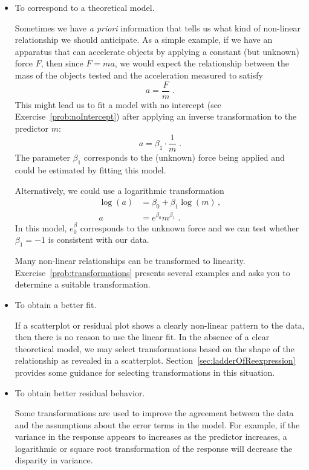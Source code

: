 \documentclass[twoside]{book}\usepackage[]{graphicx}\usepackage[]{xcolor}
\newcounter{example}[section]
\begin{document}
\begin{itemize}
  \item To correspond to a theoretical model.

	Sometimes we have \emph{a priori} information that tells us what 
	kind of non-linear relationship we should anticipate.  As a simple example,
	if we have an apparatus that can accelerate objects by applying a constant
	(but unknown) force $F$, 
	then since $F = ma$, we would expect the relationship between 
	the mass of the objects tested and the acceleration measured to satisfy
	\[
	a = \frac{F}{m}
	\;.
	\]
	This might lead us to fit a model with no intercept 
	(see Exercise~\ref{prob:noIntercept}) after applying an inverse transformation
	to the predictor $m$:
	\[
	a = \beta_1 \cdot \frac{1}{m}
	\;.
	\]
	The parameter $\beta_1$ corresponds to the (unknown) force being applied
	and could be estimated by fitting this model.

	Alternatively, we could use a logarithmic transformation
	\begin{align*}
	\log(a) &= \beta_0 + \beta_1 \log(m) \,,
	\\
	a &= e^{\beta_0}  m^{\beta_1}  \;.
	\end{align*}
	In this model, $e^\beta_0$ corresponds to the unknown force and 
	we can test whether $\beta_1 = -1$ is consistent with our data.

	Many non-linear relationships can be transformed to linearity.  
	Exercise~\ref{prob:transformations} presents several examples
	and asks you to determine a suitable transformation.

  \item To obtain a better fit.

	If a scatterplot or residual plot shows a clearly non-linear pattern 
	to the data, then there is no reason to use the linear fit.  
	In the absence of a clear theoretical model, we may select 
	transformations based on the shape of the relationship as 
	revealed in a scatterplot.  Section~\ref{sec:ladderOfReexpression}
	provides some guidance for selecting transformations in
	this situation.

  \item To obtain better residual behavior.

	Some transformations are used to improve the agreement between the
	data and the assumptions about the error terms in the model.  For example,
	if the variance in the response appears to increases as the predictor 
	increases, a logarithmic or square root transformation of the response will 
	decrease the disparity in variance.  
\end{itemize}
\end{document}
